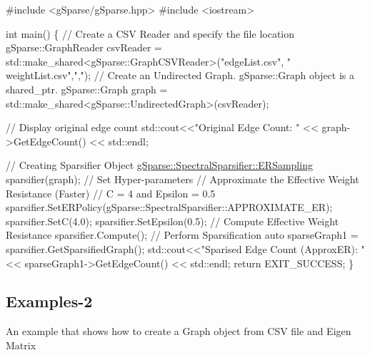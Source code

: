 \begin{DoxyCode}
\textcolor{preprocessor}{#include <gSparse/gSparse.hpp>}
\textcolor{preprocessor}{#include <iostream>}

\textcolor{keywordtype}{int} main()
\{
    \textcolor{comment}{// Create a CSV Reader and specify the file location}
    gSparse::GraphReader csvReader = std::make\_shared<gSparse::GraphCSVReader>(\textcolor{stringliteral}{"edgeList.csv"}, \textcolor{stringliteral}{"
      weightList.csv"},\textcolor{stringliteral}{","});
    \textcolor{comment}{// Create an Undirected Graph. gSparse::Graph object is a shared\_ptr.}
    gSparse::Graph graph = std::make\_shared<gSparse::UndirectedGraph>(csvReader);

    \textcolor{comment}{// Display original edge count}
    std::cout<<\textcolor{stringliteral}{"Original Edge Count: "} << graph->GetEdgeCount() << std::endl;

    \textcolor{comment}{// Creating Sparsifier Object}
    \mbox{\hyperlink{classg_sparse_1_1_spectral_sparsifier_1_1_e_r_sampling}{gSparse::SpectralSparsifier::ERSampling}} sparsifier(graph);
    \textcolor{comment}{// Set Hyper-parameters}
    \textcolor{comment}{// Approximate the Effective Weight Resistance (Faster)}
    \textcolor{comment}{// C = 4 and Epsilon = 0.5}
    sparsifier.SetERPolicy(gSparse::SpectralSparsifier::APPROXIMATE\_ER);
    sparsifier.SetC(4.0);
    sparsifier.SetEpsilon(0.5);
    \textcolor{comment}{// Compute Effective Weight Resistance}
    sparsifier.Compute();
    \textcolor{comment}{// Perform Sparsification }
    \textcolor{keyword}{auto} sparseGraph1 = sparsifier.GetSparsifiedGraph();
    std::cout<<\textcolor{stringliteral}{"Sparised Edge Count (ApproxER): "} << sparseGraph1->GetEdgeCount() << std::endl;
    \textcolor{keywordflow}{return} EXIT\_SUCCESS;
\}
\end{DoxyCode}


\subsection*{Examples-\/2}

An example that shows how to create a Graph object from C\+SV file and Eigen Matrix


